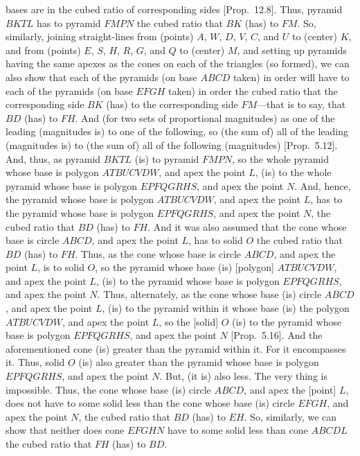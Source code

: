  bases are in the cubed ratio of corresponding sides [Prop.~12.8]. Thus, pyramid
 $BKTL$ has to pyramid $FMPN$ the cubed ratio that $BK$ (has) to $FM$. So, similarly, joining
 straight-lines from (points) $A$, $W$, $D$, $V$, $C$, and $U$ to (center) $K$, and from (points) $E$, $S$, $H$, $R$,
 $G$,  and $Q$ to (center) $M$, and setting up pyramids having the same apexes as the cones on each of the triangles (so formed), we can also show
 that each of the pyramids (on base $ABCD$ taken) in order will have to each of the pyramids (on base $EFGH$ taken) in order the cubed ratio that the corresponding side
 $BK$ (has) to the corresponding side $FM$---that is to say, that $BD$ (has) to $FH$. And (for two sets of proportional magnitudes) as one of the leading
 (magnitudes is) to one of the following, so (the sum of) all of the leading 
 (magnitudes is) to (the sum of) all of the
 following (magnitudes) [Prop.~5.12]. And, thus, as pyramid $BKTL$ (is) to pyramid $FMPN$,
 so the whole pyramid whose base is polygon $ATBUCVDW$, and apex the point $L$, (is) to the whole pyramid
 whose base is polygon $EPFQGRHS$, and apex the point $N$. And, hence, the pyramid whose base is polygon $ATBUCVDW$, and apex the point $L$, has to the pyramid
 whose base is polygon $EPFQGRHS$, and apex the point $N$, the cubed ratio that $BD$ (has) to $FH$. And it was also assumed that the cone whose base is circle $ABCD$, and apex the point $L$, has to solid $O$ the cubed ratio that $BD$ (has)
 to $FH$. Thus, as the cone whose base is circle $ABCD$, and apex the point $L$, is to solid $O$, so the pyramid
 whose base (is) [polygon] $ATBUCVDW$, and apex the point $L$, (is) to the pyramid whose base is polygon $EPFQGRHS$, and apex the point $N$. Thus, alternately, as the cone whose base (is) circle $ABCD$, and apex the point $L$, (is)
 to the pyramid within it whose base (is) the polygon $ATBUCVDW$, and apex the point $L$, so the [solid] $O$ (is)
 to the pyramid whose base is polygon  $EPFQGRHS$, and apex the point $N$ [Prop.~5.16]. And the aforementioned cone (is)
 greater than the pyramid within it. For it encompasses it. Thus, solid $O$ (is) also greater than the pyramid whose base is polygon  $EPFQGRHS$, and apex the point $N$. But, (it is) also less. The very thing is impossible. Thus, the cone whose
 base (is) circle $ABCD$, and apex the [point] $L$, does not have to some solid less than the cone whose
 base (is) circle $EFGH$, and apex the point $N$, the cubed ratio that $BD$ (has) to $EH$.  So, similarly,
 we can show that neither does cone $EFGHN$ have to some solid less than cone $ABCDL$ the cubed
 ratio that $FH$ (has) to $BD$.
 
